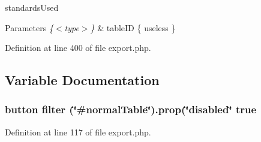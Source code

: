 standards\-Used 
\begin{DoxyParams}{Parameters}
{\em \{$<$type$>$\}} & table\-I\-D \{ useless \} \\
\hline
\end{DoxyParams}


Definition at line 400 of file export.\-php.



\subsection{Variable Documentation}
\hypertarget{export_8php_a2909f0d926ca4f5188a2847ebc640141}{
\subsubsection[{true}]{\setlength{\rightskip}{0pt plus 5cm}button filter (\char`\"{}\#normal\-Table\char`\"{}).prop(\char`\"{}disabled\char`\"{} true}}\label{export_8php_a2909f0d926ca4f5188a2847ebc640141}


Definition at line 117 of file export.\-php.

